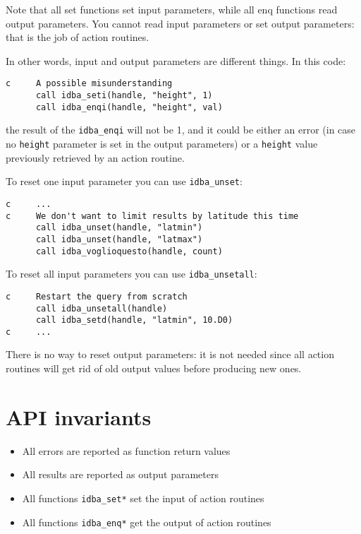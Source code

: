 \documentclass[draft,12pt,a4paper,twoside]{book}
\begin{document}
Note that all set functions set input parameters, while all enq functions read
output parameters.  You cannot read input parameters or set output parameters:
that is the job of action routines.

In other words, input and output parameters are different things.  In this
code:

\begin{verbatim}
c     A possible misunderstanding
      call idba_seti(handle, "height", 1)
      call idba_enqi(handle, "height", val)
\end{verbatim}

the result of the {\tt idba\_enqi} will not be 1, and it could be either an error
(in case no {\tt height} parameter is set in the output parameters) or a
{\tt height} value previously retrieved by an action routine.

To reset one input parameter you can use {\tt idba\_unset}:
\label{fun-idba_unset}

\begin{verbatim}
c     ...
c     We don't want to limit results by latitude this time
      call idba_unset(handle, "latmin")
      call idba_unset(handle, "latmax")
      call idba_voglioquesto(handle, count)
\end{verbatim}

To reset all input parameters you can use {\tt idba\_unsetall}:
\label{fun-idba_unsetall}

\begin{verbatim}
c     Restart the query from scratch
      call idba_unsetall(handle)
      call idba_setd(handle, "latmin", 10.D0)
c     ...
\end{verbatim}

There is no way to reset output parameters: it is not needed since all action
routines will get rid of old output values before producing new ones.


\section {API invariants}

\begin{itemize}
\item All errors are reported as function return values
\item All results are reported as output parameters
\item All functions {\tt idba\_set*} set the input of action routines
\item All functions {\tt idba\_enq*} get the output of action routines
\end{itemize}
\end{document}
